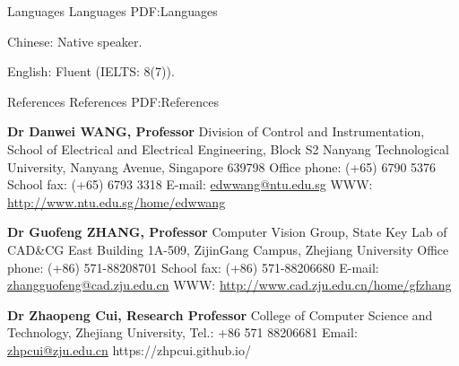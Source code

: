 \documentclass[letterpaper,MMMyyyy,nonstopmode]{simpleresumecv}
\begin{document}
\begin{Body}

\Section
{Languages}
{Languages}
{PDF:Languages}

\BulletItem
Chinese: Native speaker.

\Gap
\BulletItem
English: Fluent (IELTS: 8(7)).



\Section
{References}
{References}
{PDF:References}

\Gap
\BulletItem
\textbf{Dr Danwei WANG, Professor}
\newline
Division of Control and Instrumentation,
School of Electrical and Electrical Engineering, Block S2
\newline
Nanyang Technological University,
Nanyang Avenue, Singapore 639798
\newline
Office phone: (+65) 6790 5376
\newline
School fax: (+65) 6793 3318
\newline
E-mail: \url{edwwang@ntu.edu.sg}
\newline
WWW: \url{http://www.ntu.edu.sg/home/edwwang}


\Gap
\BulletItem
\textbf{Dr Guofeng ZHANG, Professor}
\newline
Computer Vision Group, State Key Lab of CAD\&CG
\newline
East Building 1A-509, ZijinGang Campus, Zhejiang University
\newline
Office phone: (+86) 571-88208701
\newline
School fax: (+86) 571-88206680
\newline
E-mail: \url{zhangguofeng@cad.zju.edu.cn}
\newline
WWW: \url{http://www.cad.zju.edu.cn/home/gfzhang}

\Gap
\BulletItem
\textbf{Dr Zhaopeng Cui, Research Professor}
\newline
College of Computer Science and Technology,
\newline
Zhejiang University,
\newline
Tel.: +86 571 88206681
\newline
Email: \url{zhpcui@zju.edu.cn}
\newline
https://zhpcui.github.io/



\end{Body}
\end{document}
